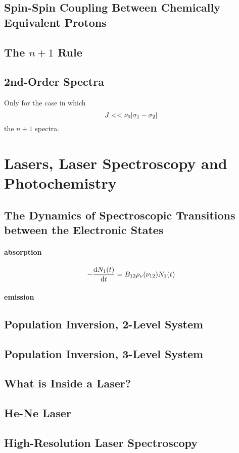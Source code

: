 \documentclass[a4paper]{article}
\numberwithin{equation}{section}
\begin{document}
\subsection{Spin-Spin Coupling Between Chemically Equivalent Protons}

\subsection{The $ n+1 $ Rule}

\subsection{2nd-Order Spectra}
Only for the case in which 
\begin{equation}\label{key}
J << \nu_0\abs{\sigma_1 - \sigma_2}
\end{equation}
the $ n+1 $ spectra.

\section{Lasers, Laser Spectroscopy and Photochemistry}
\subsection{}
\subsection{The Dynamics of Spectroscopic Transitions between the Electronic States}
\paragraph{absorption}
\begin{equation}\label{key}
-\dv{N_1(t)}{t} = B_{12}\rho_\nu(\nu_{12})N_1(t)
\end{equation}
\paragraph{emission}

\subsection{Population Inversion, 2-Level System}
\subsection{Population Inversion, 3-Level System}
\subsection{What is Inside a Laser?}
\subsection{He-Ne Laser}
\subsection{High-Resolution Laser Spectroscopy}
\end{document}

